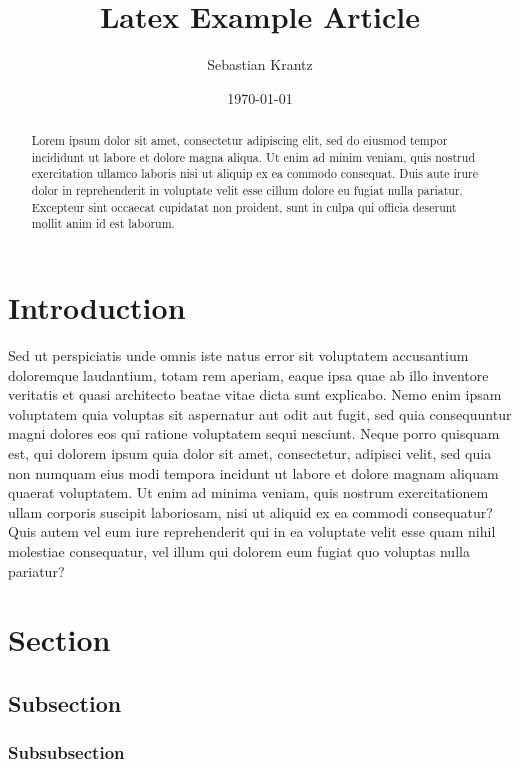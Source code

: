 \documentclass[a4paper, 14pt]{article}
\title{\textbf{Latex Example Article}}
\author{Sebastian Krantz}
\date{\today}
\begin{document}
\maketitle

\begin{abstract}
Lorem ipsum dolor sit amet, consectetur adipiscing elit, sed do eiusmod tempor incididunt ut labore et dolore magna aliqua. Ut enim ad minim veniam, quis nostrud exercitation ullamco laboris nisi ut aliquip ex ea commodo consequat. Duis aute irure dolor in reprehenderit in voluptate velit esse cillum dolore eu fugiat nulla pariatur. Excepteur sint occaecat cupidatat non proident, sunt in culpa qui officia deserunt mollit anim id est laborum.
\end{abstract}

\tableofcontents
\listoftables
\listoffigures


\newpage %

\section{Introduction}
Sed ut perspiciatis unde omnis iste natus error sit voluptatem accusantium doloremque laudantium, totam rem aperiam, eaque ipsa quae ab illo inventore veritatis et quasi architecto beatae vitae dicta sunt explicabo. Nemo enim ipsam voluptatem quia voluptas sit aspernatur aut odit aut fugit, sed quia consequuntur magni dolores eos qui ratione voluptatem sequi nesciunt. Neque porro quisquam est, qui dolorem ipsum quia dolor sit amet, consectetur, adipisci velit, sed quia non numquam eius modi tempora incidunt ut labore et dolore magnam aliquam quaerat voluptatem. Ut enim ad minima veniam, quis nostrum exercitationem ullam corporis suscipit laboriosam, nisi ut aliquid ex ea commodi consequatur? Quis autem vel eum iure reprehenderit qui in ea voluptate velit esse quam nihil molestiae consequatur, vel illum qui dolorem eum fugiat quo voluptas nulla pariatur?

\section{Section} 
\subsection{Subsection}
\subsubsection{Subsubsection}
\end{document}
